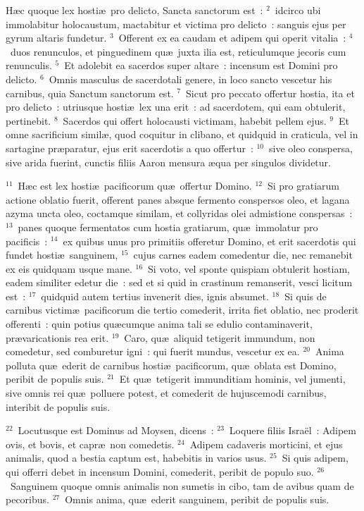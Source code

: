 \lettrine[lines=3,image=true,loversize=0.05,lraise=-0.03]{H}{}\ae c quoque lex hosti\ae\ pro delicto, Sancta sanctorum est~:
${}^{2}$~idcirco ubi immolabitur holocaustum, mactabitur et victima pro delicto~: sanguis ejus per gyrum altaris fundetur.
${}^{3}$~Offerent ex ea caudam et adipem qui operit vitalia~:
${}^{4}$~duos renunculos, et pinguedinem qu\ae\ juxta ilia est, reticulumque jecoris cum renunculis.
${}^{5}$~Et adolebit ea sacerdos super altare~: incensum est Domini pro delicto.
${}^{6}$~Omnis masculus de sacerdotali genere, in loco sancto vescetur his carnibus, quia Sanctum sanctorum est.
${}^{7}$~Sicut pro peccato offertur hostia, ita et pro delicto~: utriusque hosti\ae\ lex una erit~: ad sacerdotem, qui eam obtulerit, pertinebit.
${}^{8}$~Sacerdos qui offert holocausti victimam, habebit pellem ejus.
${}^{9}$~Et omne sacrificium simil\ae , quod coquitur in clibano, et quidquid in craticula, vel in sartagine pr\ae paratur, ejus erit sacerdotis a quo offertur~:
${}^{10}$~sive oleo conspersa, sive arida fuerint, cunctis filiis Aaron mensura \ae qua per singulos dividetur.


${}^{11}$~H\ae c est lex hosti\ae\ pacificorum qu\ae\ offertur Domino.
${}^{12}$~Si pro gratiarum actione oblatio fuerit, offerent panes absque fermento conspersos oleo, et lagana azyma uncta oleo, coctamque similam, et collyridas olei admistione conspersas~:
${}^{13}$~panes quoque fermentatos cum hostia gratiarum, qu\ae\ immolatur pro pacificis~:
${}^{14}$~ex quibus unus pro primitiis offeretur Domino, et erit sacerdotis qui fundet hosti\ae\ sanguinem,
${}^{15}$~cujus carnes eadem comedentur die, nec remanebit ex eis quidquam usque mane.
${}^{16}$~Si voto, vel sponte quispiam obtulerit hostiam, eadem similiter edetur die~: sed et si quid in crastinum remanserit, vesci licitum est~:
${}^{17}$~quidquid autem tertius invenerit dies, ignis absumet.
${}^{18}$~Si quis de carnibus victim\ae\ pacificorum die tertio comederit, irrita fiet oblatio, nec proderit offerenti~: quin potius qu\ae cumque anima tali se edulio contaminaverit, pr\ae varicationis rea erit.
${}^{19}$~Caro, qu\ae\ aliquid tetigerit immundum, non comedetur, sed comburetur igni~: qui fuerit mundus, vescetur ex ea.
${}^{20}$~Anima polluta qu\ae\ ederit de carnibus hosti\ae\ pacificorum, qu\ae\ oblata est Domino, peribit de populis suis.
${}^{21}$~Et qu\ae\ tetigerit immunditiam hominis, vel jumenti, sive omnis rei qu\ae\ polluere potest, et comederit de hujuscemodi carnibus, interibit de populis suis.


${}^{22}$~Locutusque est Dominus ad Moysen, dicens~:
${}^{23}$~Loquere filiis Isra\"el~: Adipem ovis, et bovis, et capr\ae\ non comedetis.
${}^{24}$~Adipem cadaveris morticini, et ejus animalis, quod a bestia captum est, habebitis in varios usus.
${}^{25}$~Si quis adipem, qui offerri debet in incensum Domini, comederit, peribit de populo suo.
${}^{26}$~Sanguinem quoque omnis animalis non sumetis in cibo, tam de avibus quam de pecoribus.
${}^{27}$~Omnis anima, qu\ae\ ederit sanguinem, peribit de populis suis.


